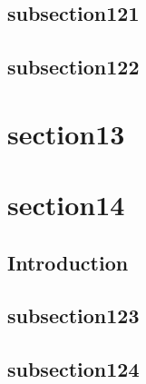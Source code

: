 \subsection{subsection121 \texorpdfstring{}{DS2}}\label{subsection121}
\lipsum[1-7]

\subsection{subsection122}\label{subsection122}
\lipsum[1-7]

\section{section13}\label{section13}
\lipsum[1-10]
\section{section14}\label{section14}

\subsection{Introduction}\label{introduction-1}
\lipsum[1]

\subsection{subsection123}\label{subsection123}
\lipsum[1-2]
\subsection{subsection124}\label{subsection124}
\lipsum[1]

